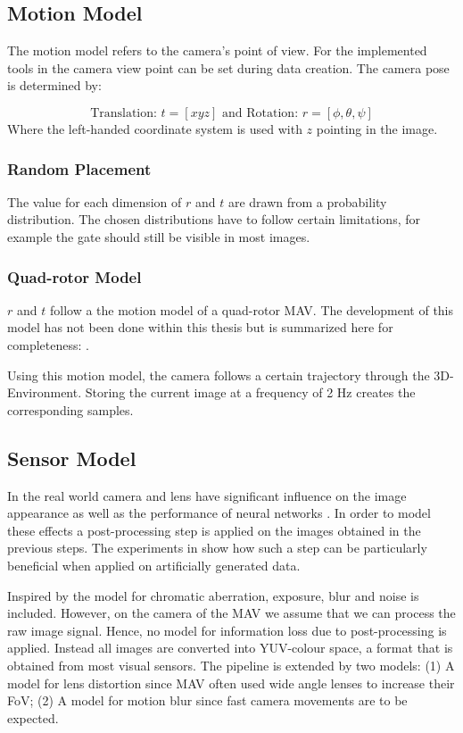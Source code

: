 \subsection{Motion Model}

The motion model refers to the camera's point of view. For the implemented tools in  the camera view point can be set during data creation. The camera pose is determined by:

$$
\text{Translation: }t = [x y z] \text{ and Rotation: } r = [\phi, \theta, \psi]
$$
Where the left-handed coordinate system is used with $z$ pointing in the image.

\subsubsection{Random Placement}
	
The value for each dimension of $r$ and $t$ are drawn from a probability distribution. The chosen distributions have to follow certain limitations, for example the gate should still be visible in most images.
	
\subsubsection{Quad-rotor Model}
	
$r$ and $t$ follow a the motion model of a quad-rotor \ac{MAV}.  The development of this model has not been done within this thesis but is summarized here for completeness: .

Using this motion model, the camera follows a certain trajectory through the 3D-Environment. Storing the current image at a frequency of 2 Hz creates the corresponding samples.
	
\subsection{Sensor Model}

In the real world camera and lens have significant influence on the image appearance as well as the performance of neural networks \cite{Andreopoulos2012,Dodge2016a}. In order to model these effects a post-processing step is applied on the images obtained in the previous steps. The experiments in \cite{Carlson2018} show how such a step can be particularly beneficial when applied on artificially generated data. 

Inspired by \cite{Carlson2018} the model for chromatic aberration, exposure, blur and noise is included. However, on the camera of the \ac{MAV} we assume that we can process the raw image signal. Hence, no model for information loss due to post-processing is applied. Instead all images are converted into YUV-colour space, a format that is obtained from most visual sensors. The pipeline is extended by two models: (1) A model for lens distortion since \ac{MAV} often used wide angle lenses to increase their \ac{FoV}; (2) A model for motion blur since fast camera movements are to be expected.

